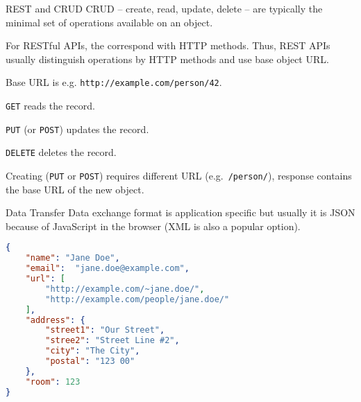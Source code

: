 \begin{frame}{REST and CRUD}
    CRUD -- create, read, update, delete -- are typically the minimal set of
    operations available on an object.
    
    \medskip
    
    For RESTful APIs, the correspond with HTTP methods.
    Thus, REST APIs usually distinguish operations by HTTP methods and
    use base object URL.
    
    \medskip
    
    Base URL is e.g. \texttt{http://example.com/person/42}.
    
    \texttt{GET} reads the record.
    
    \texttt{PUT} (or \texttt{POST}) updates the record.
    
    \texttt{DELETE} deletes the record.
    
    Creating (\texttt{PUT} or \texttt{POST}) requires different URL
    (e.g.~\texttt{/person/}), response contains the base URL of the new object.
\end{frame}


\begin{frame}[fragile]{Data Transfer}
    Data exchange format is application specific but usually
    it is JSON because of JavaScript in the browser
    (XML is also a popular option).
    
\begin{lstlisting}[language=json,style=mini]
{
    "name": "Jane Doe",
    "email":  "jane.doe@example.com",
    "url": [
        "http://example.com/~jane.doe/",
        "http://example.com/people/jane.doe/"
    ],
    "address": {
        "street1": "Our Street",
        "stree2": "Street Line #2",
        "city": "The City",
        "postal": "123 00"
    },
    "room": 123
}
\end{lstlisting}
\end{frame}


